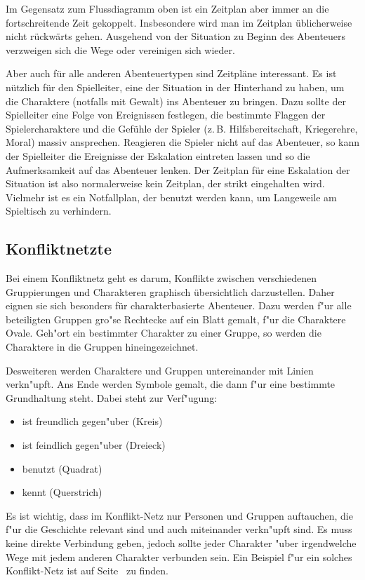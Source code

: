 Im Gegensatz zum Flussdiagramm oben ist ein Zeitplan aber immer an die fortschreitende Zeit gekoppelt. Insbesondere wird man im Zeitplan üblicherweise nicht rückwärts gehen. Ausgehend von der Situation zu Beginn des Abenteuers verzweigen sich die Wege oder vereinigen sich wieder.

Aber auch für alle anderen Abenteuertypen sind Zeitpläne interessant. Es ist nützlich für den Spielleiter, eine  der Situation in der Hinterhand zu haben, um die Charaktere (notfalls mit Gewalt) ins Abenteuer zu bringen. Dazu sollte der Spielleiter eine Folge von Ereignissen festlegen, die bestimmte Flaggen der Spielercharaktere und die Gefühle der Spieler (z.\,B. Hilfsbereitschaft, Kriegerehre, Moral) massiv ansprechen. Reagieren die Spieler nicht auf das Abenteuer, so kann der Spielleiter die Ereignisse der Eskalation eintreten lassen und so die Aufmerksamkeit auf das Abenteuer lenken. Der Zeitplan für eine Eskalation der Situation ist also normalerweise kein Zeitplan, der strikt eingehalten wird. Vielmehr ist es ein Notfallplan, der benutzt werden kann, um Langeweile am Spieltisch zu verhindern.




\subsection{Konfliktnetzte}
Bei einem Konfliktnetz geht es darum, Konflikte zwischen verschiedenen Gruppierungen und Charakteren graphisch übersichtlich darzustellen. Daher eignen sie sich besonders für charakterbasierte Abenteuer. Dazu werden f"ur alle beteiligten Gruppen gro"se Rechtecke auf ein Blatt gemalt, f"ur die Charaktere Ovale. Geh"ort ein bestimmter Charakter zu einer Gruppe, so werden die Charaktere in die Gruppen hineingezeichnet.

Desweiteren werden Charaktere und Gruppen untereinander mit Linien verkn"upft. Ans Ende werden Symbole gemalt, die dann f"ur eine bestimmte Grundhaltung steht. Dabei steht zur Verf"ugung:
\begin{itemize}
  \item ist freundlich gegen"uber (Kreis)
  \item ist feindlich gegen"uber (Dreieck)
  \item benutzt (Quadrat)
  \item kennt (Querstrich)
\end{itemize}

Es ist wichtig, dass im Konflikt-Netz nur Personen und Gruppen auftauchen, die f"ur die Geschichte relevant sind und auch miteinander verkn"upft sind. Es muss keine direkte Verbindung geben, jedoch sollte jeder Charakter "uber irgendwelche Wege mit jedem anderen Charakter verbunden sein. Ein Beispiel f"ur ein solches Konflikt-Netz ist auf Seite~\pageref{ConflictWeb1} zu finden.


